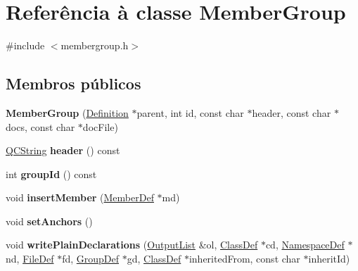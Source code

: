 \hypertarget{class_member_group}{\section{Referência à classe Member\-Group}
\label{class_member_group}
}


{\ttfamily \#include $<$membergroup.\-h$>$}

\subsection*{Membros públicos}
\begin{DoxyCompactItemize}
\item 
\hypertarget{class_member_group_ab39b2c638fe7c1375e0394c1f09745dc}{{\bfseries Member\-Group} (\hyperlink{class_definition}{Definition} $\ast$parent, int id, const char $\ast$header, const char $\ast$docs, const char $\ast$doc\-File)}\label{class_member_group_ab39b2c638fe7c1375e0394c1f09745dc}

\item 
\hypertarget{class_member_group_a52f5e6511683872e9a51ddb5cd7717b9}{\hyperlink{class_q_c_string}{Q\-C\-String} {\bfseries header} () const }\label{class_member_group_a52f5e6511683872e9a51ddb5cd7717b9}

\item 
\hypertarget{class_member_group_a06ba55aff58094f368a7077501f88d12}{int {\bfseries group\-Id} () const }\label{class_member_group_a06ba55aff58094f368a7077501f88d12}

\item 
\hypertarget{class_member_group_a107a8239a6007765234a4f336ae11bbd}{void {\bfseries insert\-Member} (\hyperlink{class_member_def}{Member\-Def} $\ast$md)}\label{class_member_group_a107a8239a6007765234a4f336ae11bbd}

\item 
\hypertarget{class_member_group_a6adda041c962425489d8ed36c20824ad}{void {\bfseries set\-Anchors} ()}\label{class_member_group_a6adda041c962425489d8ed36c20824ad}

\item 
\hypertarget{class_member_group_acbdf8ec068deb7744a5f1f38acfa88a2}{void {\bfseries write\-Plain\-Declarations} (\hyperlink{class_output_list}{Output\-List} \&ol, \hyperlink{class_class_def}{Class\-Def} $\ast$cd, \hyperlink{class_namespace_def}{Namespace\-Def} $\ast$nd, \hyperlink{class_file_def}{File\-Def} $\ast$fd, \hyperlink{class_group_def}{Group\-Def} $\ast$gd, \hyperlink{class_class_def}{Class\-Def} $\ast$inherited\-From, const char $\ast$inherit\-Id)}\label{class_member_group_acbdf8ec068deb7744a5f1f38acfa88a2}


\end{DoxyCompactItemize}
